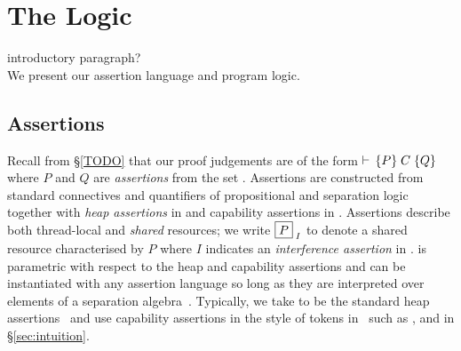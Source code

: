 \section{The \colosl Logic}\label{sec:logic}
\todo introductory paragraph?\\
We present our assertion language and program logic. 

\subsection{\colosl Assertions}
Recall from \S\ref{TODO} that our proof judgements are of the form
$\vdash\,\{P\}\;C\;\{Q\}$ where $P$ and $Q$ are \emph{assertions} from the set
\Assertions. Assertions are constructed from standard connectives and
quantifiers of propositional and separation logic together with
\emph{heap assertions} in \HAssertions and capability assertions in
\KAssertions. Assertions describe both thread-local and \emph{shared}
resources; we write $\boxed{P}_{\; I}$ to denote a shared resource
characterised by $P$ where $I$ indicates an \emph{interference
  assertion} in \IAssertions. \colosl is parametric with respect to
the heap and capability assertions and can be instantiated with any
assertion language so long as they are interpreted over elements of a
separation algebra~\cite{asl}. Typically, we take
\HAssertions to be the standard heap assertions~\cite{rey02} and
use capability assertions in the style of tokens in~\cite{TODO}
such as ,  and  in \S\ref{sec:intuition}.
% 
